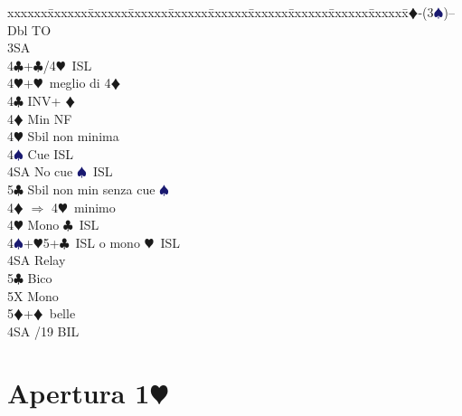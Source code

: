 \documentclass[a4paper,italian]{article}
\newcommand{\BC}{\textcolor{OliveGreen}{$\clubsuit$}}
\newcommand{\BD}{\textcolor{RedOrange}{$\vardiamondsuit$}}
\newcommand{\BH}{\textcolor{Red2}{$\varheartsuit${}}}
\newcommand{\BS}{\textcolor{MidnightBlue}{$\spadesuit${}}}
\newcommand{\pdfh}{\texorpdfstring{\BH{}}{H}}
\newenvironment{bidtable}
{\begin{tabbing}

    xxxxxx\=xxxxxx\=xxxxxx\=xxxxxx\=xxxxxx\=xxxxxx\=xxxxxx\=xxxxxx\=xxxxxx\=xxxxxx\=\kill}
{\end{tabbing} }%
\begin{document}
\begin{multicols}{2}
    \begin{bidtable}
        1\BD-(3\BS)--\+\\
        Dbl \> TO\+\\
        3SA\+\\
        4\BC {}+\BC /4\BH\ ISL\\
        4\BH {}+\BH\ meglio di 4\BD \-\-\\
        4\BC \> INV+ \BD\+\\
        4\BD \> Min NF\\
        4\BH \> Sbil non minima\\
        4\BS \> Cue ISL\\
        4SA \> No cue \BS\ ISL\\
        5\BC \> Sbil non min senza cue \BS \-\\
        4\BD \> $\Rightarrow$ 4\BH\ minimo\\
        4\BH \> Mono \BC\ ISL\\
        4\BS {}+\BH5+\BC\ ISL o mono \BH\ ISL\+\\
        4SA \> Relay\+\\
        5\BC \> Bico\\
        5X \> Mono\-\\
        5\BD {}+\BD\ belle\-\\
        4SA /19 BIL\-
    \end{bidtable}

\end{multicols}

\pagebreak

\section{Apertura 1\pdfh}
\end{document}
